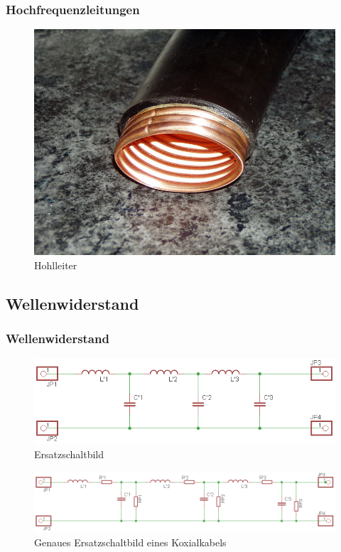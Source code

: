\begin{frame}
\frametitle{Hochfrequenzleitungen}
\begin{center}
\begin{figure}
\includegraphics[width=1\textwidth,height=.7\textheight,keepaspectratio]{e10/hohl.jpg}
\caption{Hohlleiter\cite{hohl}}
\end{figure}
\end{center}
\end{frame}

\subsection*{Wellen\-widerstand}
\begin{frame}
\frametitle{Wellenwiderstand}
\begin{figure}
\includegraphics[width=1\textwidth,height=.3\textheight,keepaspectratio]{e10/wellenesb.png}
\caption{Ersatzschaltbild}
\end{figure}
\begin{figure}
\includegraphics[width=1\textwidth,height=.3\textheight,keepaspectratio]{e10/wellenesbex.png}
\caption{Genaues Ersatzschaltbild eines Koxialkabels}
\end{figure}
\end{frame}

